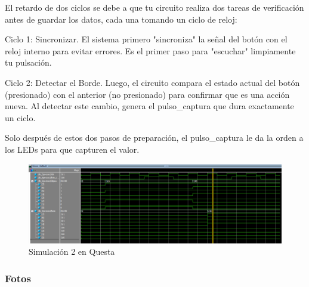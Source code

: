 El retardo de dos ciclos se debe a que tu circuito realiza dos tareas de verificación antes de guardar los datos, cada una tomando un ciclo de reloj:

Ciclo 1: Sincronizar. El sistema primero "sincroniza" la señal del botón con el reloj interno para evitar errores. Es el primer paso para "escuchar" limpiamente tu pulsación.

Ciclo 2: Detectar el Borde. Luego, el circuito compara el estado actual del botón (presionado) con el anterior (no presionado) para confirmar que es una acción nueva. Al detectar este cambio, genera el pulso\_captura que dura exactamente un ciclo.

Solo después de estos dos pasos de preparación, el pulso\_captura le da la orden a los LEDs para que capturen el valor.

\begin{figure}
    \centering
    \includegraphics[width=1\linewidth]{imagenes/Sim_2.png}
    \caption{Simulación 2 en Questa}\label{fig:Sim_2}
\end{figure}

\subsubsection*{Fotos}

